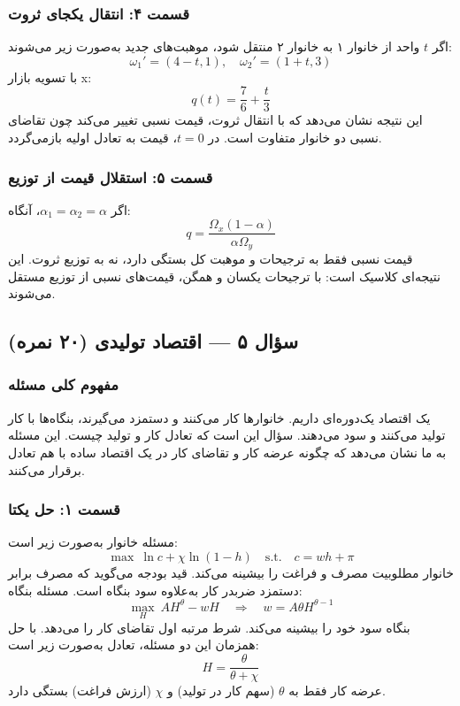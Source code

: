 \documentclass[12pt,a4paper]{article}
\begin{document}
\subsubsection*{قسمت ۴: انتقال یکجای ثروت}

اگر $t$ واحد از خانوار ۱ به خانوار ۲ منتقل شود، موهبت‌های جدید به‌صورت زیر می‌شوند:
\[
	\omega_1' = (4 - t, 1), \quad \omega_2' = (1 + t, 3)
\]
با تسویه بازار x:
\[
	q(t) = \frac{7}{6} + \frac{t}{3}
\]
این نتیجه نشان می‌دهد که با انتقال ثروت، قیمت نسبی تغییر می‌کند چون تقاضای نسبی دو خانوار متفاوت است. در $t = 0$، قیمت به تعادل اولیه بازمی‌گردد.

\subsubsection*{قسمت ۵: استقلال قیمت از توزیع}

اگر $\alpha_1 = \alpha_2 = \alpha$، آنگاه:
\[
	q = \frac{\Omega_x (1 - \alpha)}{\alpha \Omega_y}
\]
قیمت نسبی فقط به ترجیحات و موهبت کل بستگی دارد، نه به توزیع ثروت. این نتیجه‌ای کلاسیک است: با ترجیحات یکسان و همگن، قیمت‌های نسبی از توزیع مستقل می‌شوند.

\subsection{سؤال ۵ — اقتصاد تولیدی (۲۰ نمره)}

\subsubsection*{مفهوم کلی مسئله}

یک اقتصاد یک‌دوره‌ای داریم. خانوارها کار می‌کنند و دستمزد می‌گیرند، بنگاه‌ها با کار تولید می‌کنند و سود می‌دهند. سؤال این است که تعادل کار و تولید چیست. این مسئله به ما نشان می‌دهد که چگونه عرضه کار و تقاضای کار در یک اقتصاد ساده با هم تعادل برقرار می‌کنند.

\subsubsection*{قسمت ۱: حل یکتا}

مسئله خانوار به‌صورت زیر است:
\[
	\max \ \ln c + \chi \ln(1-h)
	\quad \text{s.t.} \quad
	c = w h + \pi
\]
خانوار مطلوبیت مصرف و فراغت را بیشینه می‌کند. قید بودجه می‌گوید که مصرف برابر دستمزد ضربدر کار به‌علاوه سود بنگاه است. مسئله بنگاه:
\[
	\max_{H} \ A H^\theta - w H
	\quad \Rightarrow \quad
	w = A \theta H^{\theta - 1}
\]
بنگاه سود خود را بیشینه می‌کند. شرط مرتبه اول تقاضای کار را می‌دهد. با حل همزمان این دو مسئله، تعادل به‌صورت زیر است:
\[
	H = \frac{\theta}{\theta + \chi}
\]
عرضه کار فقط به $\theta$ (سهم کار در تولید) و $\chi$ (ارزش فراغت) بستگی دارد.
\end{document}
